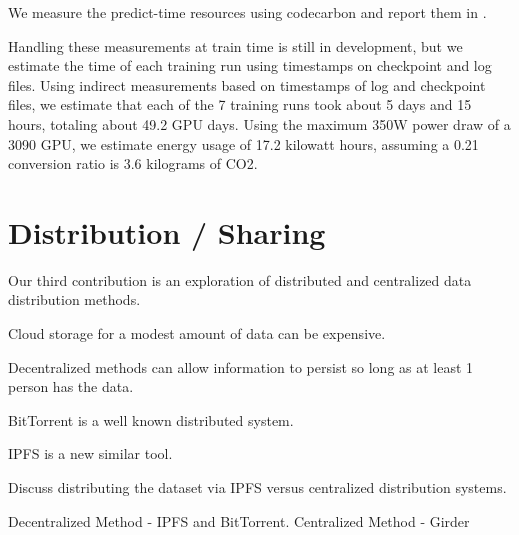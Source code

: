 \documentclass[10pt,twocolumn,letterpaper]{article}
\begin{document}
We measure the predict-time resources using codecarbon \cite{lacoste2019codecarbon} and report them in .

Handling these measurements at train time is still in development, but we
estimate the time of each training run using timestamps on checkpoint and log
files.  Using indirect measurements based on timestamps of log and checkpoint
files, we estimate that each of the 7 training runs took about 5 days and 15
hours, totaling about 49.2 GPU days. Using the maximum 350W power draw of a
3090 GPU, we estimate energy usage of 17.2 kilowatt hours, assuming a 0.21
conversion ratio is 3.6 kilograms of CO2.

\begin{comment}
import kwutil.util_units

reg = kwutil.util_units.unit_registry()
gpu_power = 350 * reg.watt
time = 49.2 * reg.hour

co2kg_per_kwh = 0.210
energy_usage = (gpu_power *  time).to(reg.kilowatt * reg.hour)

co2_kg = energy_usage.m * co2kg_per_kwh
print(f'{round(co2_kg, 1)} CO2 kg')

dollar_per_kg = 0.015

cost_to_offset = dollar_per_kg * co2_kg
print(f'cost_to_offset = ${cost_to_offset:4.2f}')
\end{comment}


\section{Distribution / Sharing}


Our third contribution is an exploration of distributed and centralized data distribution methods. 

Cloud storage for a modest amount of data can be expensive.

Decentralized methods can allow information to persist so long as at least 1
person has the data.

BitTorrent is a well known distributed system.

IPFS is a new similar tool.


Discuss distributing the dataset via IPFS versus centralized distribution
systems.

Decentralized Method - IPFS and BitTorrent.
Centralized Method - Girder
\end{document}
